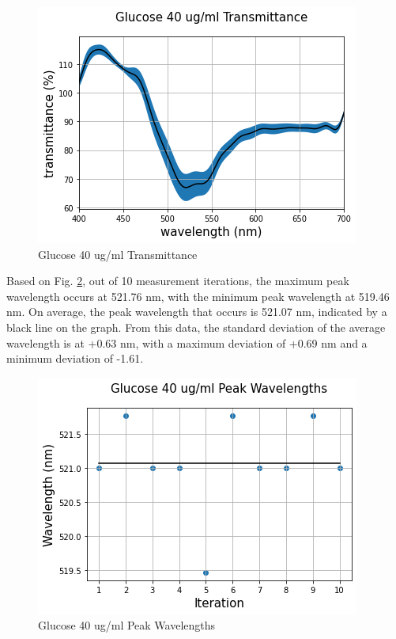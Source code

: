 \documentclass[conference]{IEEEtran}
\begin{document}
\begin{figure}[htbp]
    \centerline{\includegraphics[scale=0.5]{glucosetransmittanceALL.png}}
    \caption{Glucose 40 ug/ml Transmittance}
    \label{glucose_transmittance_all}
    \end{figure}

Based on Fig. \ref{glucose_peak_wavelength}, out of 10 measurement iterations, the maximum peak wavelength occurs at 521.76 nm, with the minimum peak wavelength at 519.46 nm.
On average, the peak wavelength that occurs is 521.07 nm, indicated by a black line on the graph.
From this data, the standard deviation of the average wavelength is at +0.63 nm, with a maximum deviation of +0.69 nm and a minimum deviation of -1.61.

\begin{figure}[htbp]
    \centerline{\includegraphics[scale=0.5]{glucose_peakwavelength.png}}
    \caption{Glucose 40 ug/ml Peak Wavelengths}
    \label{glucose_peak_wavelength}
    \end{figure}
\end{document}
